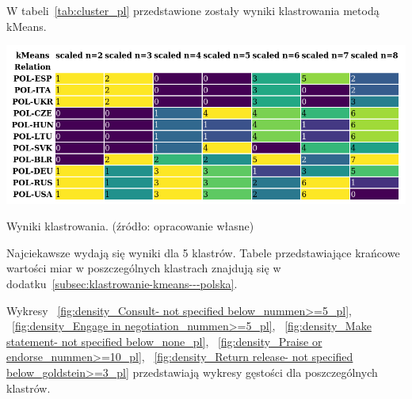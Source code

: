 \documentclass[11pt]{report}
\begin{document}
    W tabeli~\ref{tab:cluster_pl} przedstawione zostały wyniki klastrowania metodą kMeans.
    \begin{table}[!htp]
        \centering
        \includegraphics[width=\linewidth]{../Power-Client pre analysis/cluster_pl.png}
        \caption{Wyniki klastrowania. (źródło: opracowanie własne)}
        \label{tab:cluster_pl}
    \end{table}

    Najciekawsze wydają się wyniki dla 5 klastrów.
    Tabele przedstawiające krańcowe wartości miar w poszczególnych klastrach znajdują się w dodatku~\ref{subsec:klastrowanie-kmeans---polska}.

    Wykresy
    ~\ref{fig:density_Consult- not specified below_nummen>=5_pl},
    ~\ref{fig:density_Engage in negotiation_nummen>=5_pl},
    ~\ref{fig:density_Make statement- not specified below_none_pl},
    ~\ref{fig:density_Praise or endorse_nummen>=10_pl},
    ~\ref{fig:density_Return release- not specified below_goldstein>=3_pl}
    przedstawiają wykresy gęstości dla poszczególnych klastrów.
\end{document}

